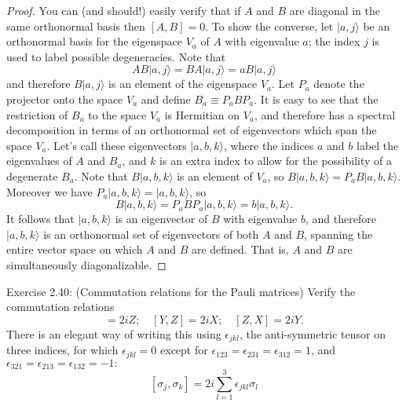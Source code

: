 \begin{proof}
    You can (and should!) easily verify that if $A$ and $B$ are diagonal in the same orthonormal basis then $[A, B]=0$. To show the converse, let $|a, j\rangle$ be an orthonormal basis for the eigenspace $V_{a}$ of $A$ with eigenvalue $a$; the index $j$ is used to label possible degeneracies. Note that
\begin{equation}
    A B|a, j\rangle=B A|a, j\rangle=a B|a, j\rangle
\end{equation}
and therefore $B|a, j\rangle$ is an element of the eigenspace $V_{a}$. Let $P_{a}$ denote the projector onto the space $V_{a}$ and define $B_{a} \equiv P_{a} B P_{a}$. It is easy to see that the restriction of $B_{a}$ to the space $V_{a}$ is Hermitian on $V_{a}$, and therefore has a spectral decomposition in terms of an orthonormal set of eigenvectors which span the space $V_{a}$. Let's call these eigenvectors $|a, b, k\rangle$, where the indices $a$ and $b$ label the eigenvalues of $A$ and $B_{a}$, and $k$ is an extra index to allow for the possibility of a degenerate $B_{a}$. Note that $B|a, b, k\rangle$ is an element of $V_{a}$, so $B|a, b, k\rangle=P_{a} B|a, b, k\rangle$. Moreover we have $P_{a}|a, b, k\rangle=|a, b, k\rangle$, so
\begin{equation}
    B|a, b, k\rangle=P_{a} B P_{a}|a, b, k\rangle=b|a, b, k\rangle .
\end{equation}
It follows that $|a, b, k\rangle$ is an eigenvector of $B$ with eigenvalue $b$, and therefore $|a, b, k\rangle$ is an orthonormal set of eigenvectors of both $A$ and $B$, spanning the entire vector space on which $A$ and $B$ are defined. That is, $A$ and $B$ are simultaneously diagonalizable.
\end{proof}

\begin{exercise}
Exercise 2.40: (Commutation relations for the Pauli matrices) Verify the commutation relations
\begin{equation}
    [X, Y]=2 i Z ; \quad[Y, Z]=2 i X ; \quad[Z, X]=2 i Y .
\end{equation}
There is an elegant way of writing this using $\epsilon_{j k l}$, the anti-symmetric tensor on three indices, for which $\epsilon_{j k l}=0$ except for $\epsilon_{123}=\epsilon_{231}=\epsilon_{312}=1$, and $\epsilon_{321}=\epsilon_{213}=\epsilon_{132}=-1:$
\begin{equation}
    \left[\sigma_{j}, \sigma_{k}\right]=2 i \sum_{l=1}^{3} \epsilon_{j k l} \sigma_{l}
\end{equation}
\end{exercise}

